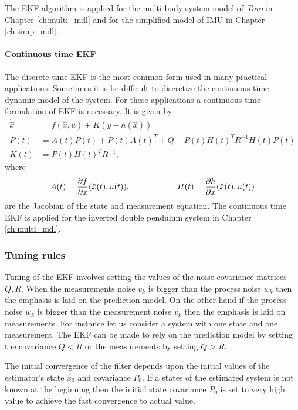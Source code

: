 The EKF algorithm is applied for the multi body system model of \emph{Toro} in Chapter \ref{ch:multi_mdl} and for the simplified model of IMU in Chapter \ref{ch:simp_mdl}.

\paragraph{Continuous time EKF}
The discrete time EKF is the most common form used in many practical applications. Sometimes it is be difficult to discretize the continuous time dynamic model of the system. For these applications a continuous time formulation of EKF is necessary. It is given by \citep{gel74}
\begin{equation}
    \label{eq:ekf_con}
    \begin{split}
        \dot {\hat x} &= f(\hat x,u) + K ( y-h(\hat x))\\
        \dot P(t) &= A(t)P(t) + P(t)A(t)^T + Q - P(t)H(t)^TR^{-1}H(t)P(t)\\
        K(t) &= P(t)H(t)^TR^{-1},
    \end{split}
\end{equation}
where $$A(t) = \frac{\partial {f}}{\partial {x}}(\hat x(t), u(t)), \hspace{2cm} H(t) = \frac{\partial {h}}{\partial {x}} (\hat x(t), u(t))$$ are the Jacobian of the state and measurement equation. The continuous time EKF is applied for the inverted double pendulum system in Chapter \ref{ch:multi_mdl}.

\subsubsection{Tuning rules}
\label{subsec:tune_ekf}
Tuning of the EKF involves setting the values of the noise covariance matrices $Q,R$. When the measurements noise $v_k$ is bigger than the process noise $w_k$ then the emphasis is laid on the prediction model. On the other hand if the process noise $w_k$ is bigger than the measurement noise $v_k$ then the emphasis is laid on measurements. For instance let us consider a system with one state and one measurement. The EKF can be made to rely on the prediction model by setting the covariance $Q<R$ or the measurements by setting $Q>R$.

The initial convergence of the filter depends upon the initial values of the estimator's state $\hat x_0$ and covariance $P_0$. If a states of the estimated system is not known at the beginning then the initial state covariance $P_0$ is set to very high value to achieve the fast convergence to actual value.

